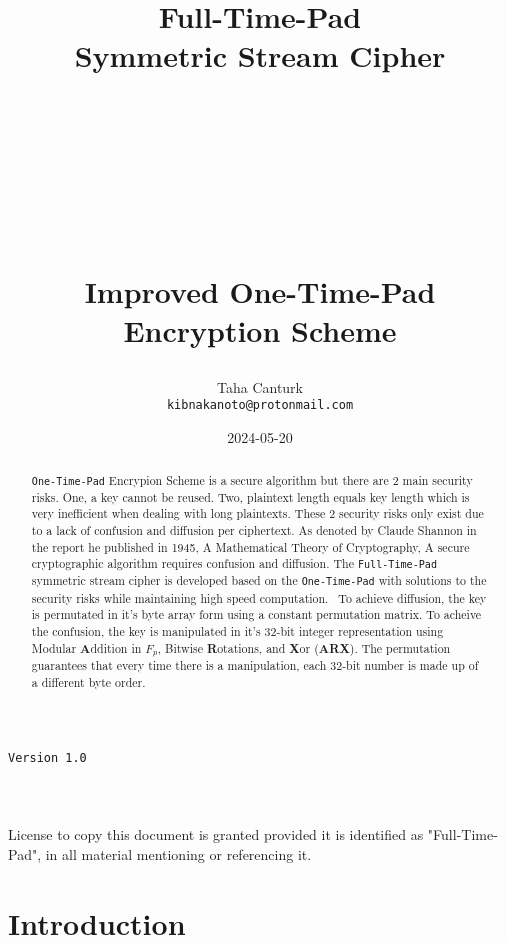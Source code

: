 \documentclass[fleqn, a4paper,12pt]{article}
\title {
	\Huge \textbf{Full-Time-Pad\\Symmetric Stream Cipher} \\
	\ \\
	\ \\
	\ \\
	\ \\
	\ \\
	\Large \textbf{Improved One-Time-Pad Encryption Scheme}

}
\author{Taha Canturk\\\texttt{kibnakanoto@protonmail.com}}
\date{2024-05-20}
\begin{document}
\maketitle
\thispagestyle{empty}


\begin{center}
		\Large \texttt{Version 1.0}
		\ \\
		\ \\
		\ \\
		\ \\
		\small License to copy this document is granted provided it is identified as "Full-Time-Pad", in all material mentioning or referencing it.
\end{center}

\newpage


\begin{abstract}
		\fontsize{12}{18}\selectfont \texttt{One-Time-Pad} Encrypion Scheme is a secure algorithm but there are 2 main security risks. One, a key cannot be reused. Two, plaintext length equals key length which is very inefficient when dealing with long plaintexts. These 2 security risks only exist due to a lack of confusion and diffusion per ciphertext. As denoted by Claude Shannon in the report he published in 1945, A Mathematical Theory of Cryptography, A secure cryptographic algorithm requires confusion and diffusion. The \texttt{Full-Time-Pad} symmetric stream cipher is developed based on the \texttt{One-Time-Pad} with solutions to the security risks while maintaining high speed computation. \
		To achieve diffusion, the key is permutated in it's byte array form using a constant permutation matrix. To acheive the confusion, the key is manipulated in it's 32-bit integer representation using Modular \textbf{A}ddition in $F_p$, Bitwise \textbf{R}otations, and \textbf{X}or (\textbf{ARX}). The permutation guarantees that every time there is a manipulation, each 32-bit number is made up of a different byte order.


\end{abstract}

\newpage

\tableofcontents

\newpage


\section{Introduction}
\end{document}
